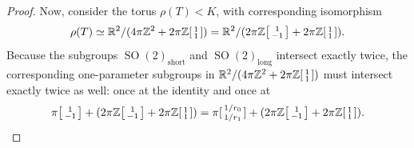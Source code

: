 \documentclass[12pt,a4paper]{amsart}
\theoremstyle{definition}
\DeclareMathOperator{\SOrth}{SO}
\newenvironment{smallbmatrix}
  {\left[\begin{smallmatrix}}
  {\end{smallmatrix}\right]}
\begin{document}
\begin{proof}
Now, consider the torus $\rho(T)<K$, with corresponding isomorphism
\[\rho(T)\simeq\mathbb{R}^2/(4\pi\mathbb{Z}^2+2\pi\mathbb{Z}\begin{smallbmatrix}1 \\ 1\end{smallbmatrix})=\mathbb{R}^2/(2\pi\mathbb{Z}\begin{smallbmatrix}1 \\ -1\end{smallbmatrix}+2\pi\mathbb{Z}\begin{smallbmatrix}1 \\ 1\end{smallbmatrix}).\]
Because the subgroups $\SOrth(2)_\text{short}$ and $\SOrth(2)_\text{long}$ intersect exactly twice, the corresponding one-parameter subgroups in $\mathbb{R}^2/(4\pi\mathbb{Z}^2+2\pi\mathbb{Z}\begin{smallbmatrix}1 \\ 1\end{smallbmatrix})$ must intersect exactly twice as well: once at the identity and once at
\[\pi\begin{smallbmatrix}1 \\ -1\end{smallbmatrix}+(2\pi\mathbb{Z}\begin{smallbmatrix}1 \\ -1\end{smallbmatrix}+2\pi\mathbb{Z}\begin{smallbmatrix}1 \\ 1\end{smallbmatrix})=\pi[\begin{smallmatrix}1/r_0 \\ 1/r_1\end{smallmatrix}]+(2\pi\mathbb{Z}\begin{smallbmatrix}1 \\ -1\end{smallbmatrix}+2\pi\mathbb{Z}\begin{smallbmatrix}1 \\ 1\end{smallbmatrix}).\]

\end{proof}
\end{document}
